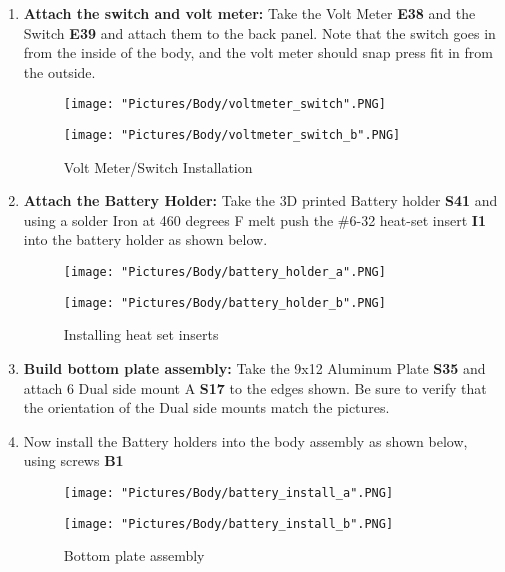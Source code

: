 \documentclass[12pt]{article}
\begin{document}
\begin{enumerate}
\item \textbf{Attach the switch and volt meter:} Take the Volt Meter \textbf{E38} and the Switch \textbf{E39} and attach them to the back panel. Note that the switch goes in from the inside of the body, and the volt meter should snap press fit in from the outside.

\begin{figure}[H]
  \centering
  \begin{minipage}[b]{0.45\textwidth}
    \texttt{[image: "Pictures/Body/voltmeter\_switch".PNG]}
  \end{minipage}
  \hfill
  \begin{minipage}[b]{0.45\textwidth}
    \texttt{[image: "Pictures/Body/voltmeter\_switch\_b".PNG]}
  \end{minipage}
  \caption{Volt Meter/Switch Installation}
  \label{bottom}
\end{figure}


\item \textbf{Attach the Battery Holder:} Take the 3D printed Battery holder \textbf{S41} and using a solder Iron at 460 degrees F melt push the \#6-32 heat-set insert  \textbf{I1} into the battery holder as shown below.

\begin{figure}[H]
  \centering
  \begin{minipage}[b]{0.45\textwidth}
    \texttt{[image: "Pictures/Body/battery\_holder\_a".PNG]}
  \end{minipage}
  \hfill
  \begin{minipage}[b]{0.45\textwidth}
    \texttt{[image: "Pictures/Body/battery\_holder\_b".PNG]}
  \end{minipage}
  \caption{Installing heat set inserts}
\end{figure}

\item \textbf{Build bottom plate assembly:} Take the 9x12 Aluminum Plate \textbf{S35} and attach 6 Dual side mount A \textbf{S17} to the edges shown. Be sure to verify that the orientation of the Dual side mounts match the pictures.

\item Now install the Battery holders into the body assembly as shown below, using screws \textbf{B1}

\begin{figure}[H]
  \centering
  \begin{minipage}[b]{0.45\textwidth}
    \texttt{[image: "Pictures/Body/battery\_install\_a".PNG]}
  \end{minipage}
  \hfill
  \begin{minipage}[b]{0.45\textwidth}
    \texttt{[image: "Pictures/Body/battery\_install\_b".PNG]}
  \end{minipage}
  \caption{Bottom plate assembly}
  \label{bottom}
\end{figure}



\end{enumerate}
\end{document}

